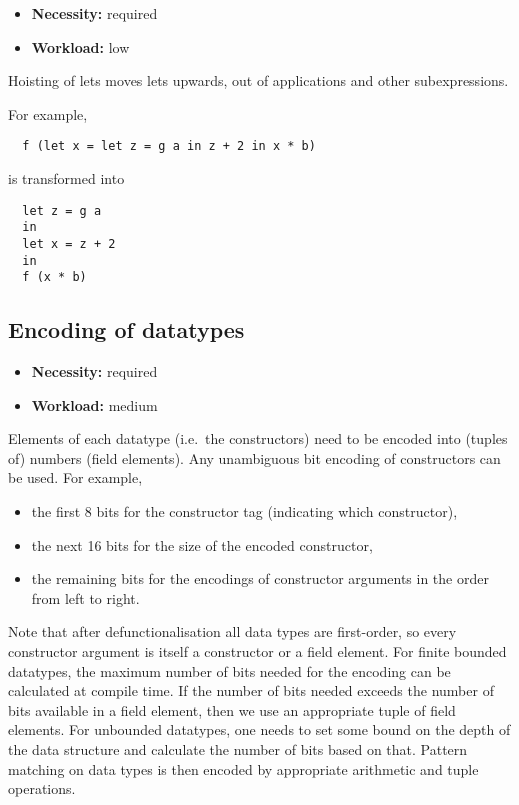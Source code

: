 \begin{itemize}
\item {\bf Necessity:} required
\item {\bf Workload:} low
\end{itemize}

\noindent Hoisting of lets moves lets upwards, out of applications and
other subexpressions.

\medskip

\noindent For example,
\begin{verbatim}
  f (let x = let z = g a in z + 2 in x * b)
\end{verbatim}
is transformed into
\begin{verbatim}
  let z = g a
  in
  let x = z + 2
  in
  f (x * b)
\end{verbatim}

\subsection{Encoding of datatypes}

\begin{itemize}
\item {\bf Necessity:} required
\item {\bf Workload:} medium
\end{itemize}

Elements of each datatype (i.e.~the constructors) need to be encoded
into (tuples of) numbers (field elements). Any unambiguous bit
encoding of constructors can be used. For example,
\begin{itemize}
\item the first 8 bits for the constructor tag (indicating which
  constructor),
\item the next 16 bits for the size of the encoded constructor,
\item the remaining bits for the encodings of constructor arguments in
  the order from left to right.
\end{itemize}
Note that after defunctionalisation all data types are first-order, so
every constructor argument is itself a constructor or a field
element. For finite bounded datatypes, the maximum number of bits
needed for the encoding can be calculated at compile time. If the
number of bits needed exceeds the number of bits available in a field
element, then we use an appropriate tuple of field elements. For
unbounded datatypes, one needs to set some bound on the depth of the
data structure and calculate the number of bits based on that. Pattern
matching on data types is then encoded by appropriate arithmetic and
tuple operations.

